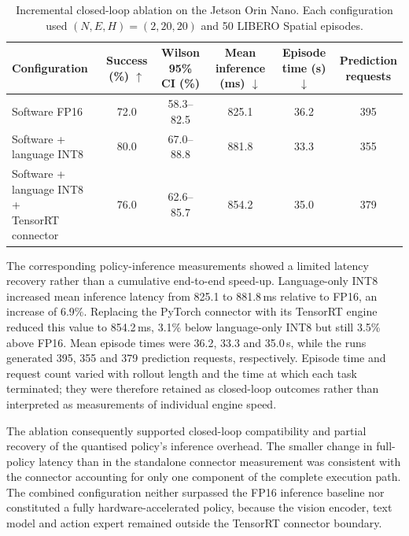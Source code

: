 \begin{table}
  \centering
  \caption{Incremental closed-loop ablation on the Jetson Orin Nano.
  Each configuration used \((N,E,H)=(2,20,20)\) and 50 LIBERO Spatial
  episodes.}
  \label{tab:jetson_ablation}
  \small
  \setlength{\tabcolsep}{4pt}
  \begin{tabular}{@{}lccccc@{}}
      \toprule
      Configuration &
      \shortstack{Success\\(\%) \(\uparrow\)} &
      \shortstack{Wilson 95\%\\CI (\%)} &
      \shortstack{Mean inference\\(ms) \(\downarrow\)} &
      \shortstack{Episode time\\(s) \(\downarrow\)} &
      \shortstack{Prediction\\requests} \\
      \midrule
      Software FP16 & 72.0 & 58.3--82.5 & 825.1 & 36.2 & 395 \\
      Software + language INT8 & 80.0 & 67.0--88.8 & 881.8 & 33.3 & 355 \\
      \shortstack[l]{Software + language INT8 +\\TensorRT connector}
        & 76.0 & 62.6--85.7 & 854.2 & 35.0 & 379 \\
      \bottomrule
  \end{tabular}
\end{table}

The corresponding policy-inference measurements showed a limited latency
recovery rather than a cumulative end-to-end speed-up. Language-only INT8
increased mean inference latency from 825.1 to 881.8\,ms relative to FP16, an
increase of 6.9\%. Replacing the PyTorch connector with its TensorRT engine
reduced this value to 854.2\,ms, 3.1\% below language-only INT8 but still 3.5\%
above FP16. Mean episode times were 36.2, 33.3 and 35.0\,s, while the runs
generated 395, 355 and 379 prediction requests, respectively. Episode time and
request count varied with rollout length and the time at which each task
terminated; they were therefore retained as closed-loop outcomes rather than
interpreted as measurements of individual engine speed.

The ablation consequently supported closed-loop compatibility and partial
recovery of the quantised policy's inference overhead. The smaller change in
full-policy latency than in the standalone connector measurement was consistent
with the connector accounting for only one component of the complete execution
path. The combined configuration neither surpassed the FP16 inference baseline
nor constituted a fully hardware-accelerated policy, because the vision encoder,
text model and action expert remained outside the TensorRT connector boundary.

